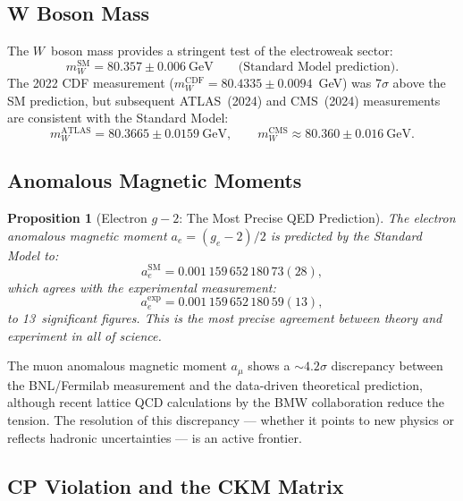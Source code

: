 \documentclass[12pt]{article}
\newtheorem{proposition}[theorem]{Proposition}
\theoremstyle{definition}
\theoremstyle{remark}
\begin{document}
\subsection{W Boson Mass}

The $W$~boson mass provides a stringent test of the electroweak sector:
\begin{equation}
m_W^{\mathrm{SM}} = 80.357 \pm 0.006~\text{GeV} \qquad \text{(Standard Model prediction)}.
\end{equation}
The 2022 CDF measurement ($m_W^{\mathrm{CDF}} = 80.4335 \pm 0.0094$~GeV) was $7\sigma$ above the SM prediction, but subsequent ATLAS~(2024) and CMS~(2024) measurements are consistent with the Standard Model:
\begin{equation}
m_W^{\mathrm{ATLAS}} = 80.3665 \pm 0.0159~\text{GeV}, \qquad m_W^{\mathrm{CMS}} \approx 80.360 \pm 0.016~\text{GeV}.
\end{equation}

\subsection{Anomalous Magnetic Moments}

\begin{proposition}[Electron $g-2$: The Most Precise QED Prediction]
\label{prop:electron-g2}
The electron anomalous magnetic moment $a_e = (g_e - 2)/2$ is predicted by the Standard Model to:
\begin{equation}
a_e^{\mathrm{SM}} = 0.001\,159\,652\,180\,73(28),
\end{equation}
which agrees with the experimental measurement:
\begin{equation}
a_e^{\mathrm{exp}} = 0.001\,159\,652\,180\,59(13),
\end{equation}
to 13~significant figures. This is the most precise agreement between theory and experiment in all of science.
\end{proposition}

The muon anomalous magnetic moment $a_\mu$ shows a $\sim 4.2\sigma$ discrepancy between the BNL/Fermilab measurement and the data-driven theoretical prediction, although recent lattice QCD calculations by the BMW collaboration reduce the tension. The resolution of this discrepancy --- whether it points to new physics or reflects hadronic uncertainties --- is an active frontier.

\subsection{CP Violation and the CKM Matrix}
\end{document}
